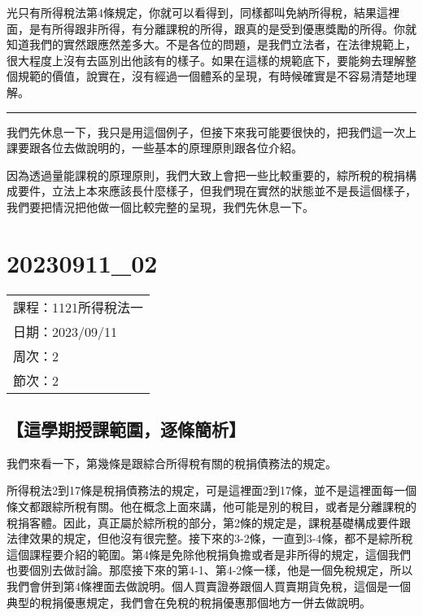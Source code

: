 \documentclass[]{ctexbook}
\begin{document}
光只有所得稅法第4條規定，你就可以看得到，同樣都叫免納所得稅，結果這裡面，是有所得跟非所得，有分離課稅的所得，跟真的是受到優惠獎勵的所得。你就知道我們的實然跟應然差多大。不是各位的問題，是我們立法者，在法律規範上，很大程度上沒有去區別出他該有的樣子。如果在這樣的規範底下，要能夠去理解整個規範的價值，說實在，沒有經過一個體系的呈現，有時候確實是不容易清楚地理解。

\begin{center}\rule{0.5\linewidth}{0.5pt}\end{center}

我們先休息一下，我只是用這個例子，但接下來我可能要很快的，把我們這一次上課要跟各位去做說明的，一些基本的原理原則跟各位介紹。

因為透過量能課稅的原理原則，我們大致上會把一些比較重要的，綜所稅的稅捐構成要件，立法上本來應該長什麼樣子，但我們現在實然的狀態並不是長這個樣子，我們要把情況把他做一個比較完整的呈現，我們先休息一下。

\hypertarget{section-4}{%
\chapter{20230911\_02}\label{section-4}}

\begin{longtable}[]{@{}l@{}}
\toprule()
\endhead
課程：1121所得稅法一 \\
日期：2023/09/11 \\
周次：2 \\
節次：2 \\
\bottomrule()
\end{longtable}

\hypertarget{ux9019ux5b78ux671fux6388ux8ab2ux7bc4ux570dux9010ux689dux7c21ux6790}{%
\section{【這學期授課範圍，逐條簡析】}\label{ux9019ux5b78ux671fux6388ux8ab2ux7bc4ux570dux9010ux689dux7c21ux6790}}

我們來看一下，第幾條是跟綜合所得稅有關的稅捐債務法的規定。

所得稅法2到17條是稅捐債務法的規定，可是這裡面2到17條，並不是這裡面每一個條文都跟綜所稅有關。他在概念上面來講，他可能是別的稅目，或者是分離課稅的稅捐客體。因此，真正屬於綜所稅的部分，第2條的規定是，課稅基礎構成要件跟法律效果的規定，但他沒有很完整。接下來的3-2條，一直到3-4條，都不是綜所稅這個課程要介紹的範圍。第4條是免除他稅捐負擔或者是非所得的規定，這個我們也要個別去做討論。那麼接下來的第4-1、第4-2條一樣，他是一個免稅規定，所以我們會併到第4條裡面去做說明。個人買賣證券跟個人買賣期貨免稅，這個是一個典型的稅捐優惠規定，我們會在免稅的稅捐優惠那個地方一併去做說明。
\end{document}
